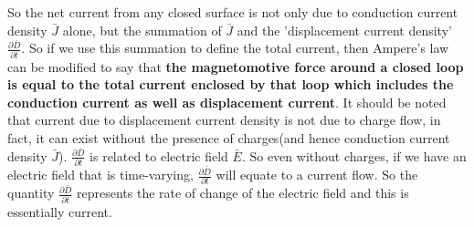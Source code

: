 So the net current from any closed surface is not only due to conduction current density $\bar{J}$ alone, but the summation of $\bar{J}$ and the 'displacement current density' $\frac{\partial\bar{D}}{\partial t}$. So if we use this summation to define the total current, then Ampere's law can be modified to say that \textbf{the magnetomotive force around a closed loop is equal to the total current enclosed by that loop which includes the conduction current as well as displacement current}. It should be noted that current due to displacement current density is not due to charge flow, in fact, it can exist without the presence of charges(and hence conduction current density $\bar{J}$). $\frac{\partial\bar{D}}{\partial t}$ is related to electric field $\bar{E}$. So even without charges, if we have an electric field that is time-varying, $\frac{\partial\bar{D}}{\partial t}$ will equate to a current flow. So the quantity $\frac{\partial\bar{D}}{\partial t}$ represents the rate of change of the electric field and this is essentially current.

